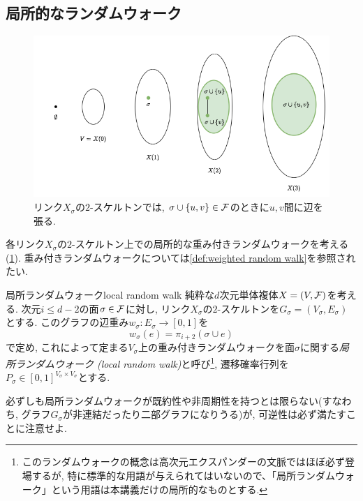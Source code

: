 \subsection{局所的なランダムウォーク}
\begin{figure}
    \begin{center}
    \includegraphics[width=13cm]{images/link.png}
    \caption{リンク$X_\sigma$の$2$-スケルトンでは, $\sigma\cup\{u,v\}\in \mathcal{F}$のときに$u,v$間に辺を張る. \label{fig:link and skelton}}
    \end{center}
\end{figure}
各リンク$X_\sigma$の$2$-スケルトン上での局所的な重み付きランダムウォークを考える (\cref{fig:link and skelton}).
重み付きランダムウォークについては\cref{def:weighted random walk}を参照されたい.
%
\begin{definition}{局所ランダムウォーク}{local random walk}
    純粋な$d$次元単体複体$X = (V,\mathcal{F})$を考える.
    次元$i \le d-2$の面$\sigma \in \mathcal{F}$に対し,
        リンク$X_\sigma$の$2$-スケルトンを$G_\sigma = (V_\sigma,E_\sigma)$とする.
    このグラフの辺重み$w_\sigma\colon E_\sigma \to [0,1]$を
    \[ w_\sigma(e) = \pi_{i+2}(\sigma\cup e) \]
    で定め, これによって定まる$V_\sigma$上の重み付きランダムウォークを面$\sigma$に関する\emph{局所ランダムウォーク (local random walk)}と呼び\footnote{このランダムウォークの概念は高次元エクスパンダーの文脈ではほぼ必ず登場するが, 特に標準的な用語が与えられてはいないので、「局所ランダムウォーク」という用語は本講義だけの局所的なものとする.}, 遷移確率行列を$P_\sigma\in [0,1]^{V_\sigma\times V_\sigma}$とする.
\end{definition}
%
必ずしも局所ランダムウォークが既約性や非周期性を持つとは限らない(すなわち, グラフ$G_\sigma$が非連結だったり二部グラフになりうる)が,
可逆性は必ず満たすことに注意せよ.

